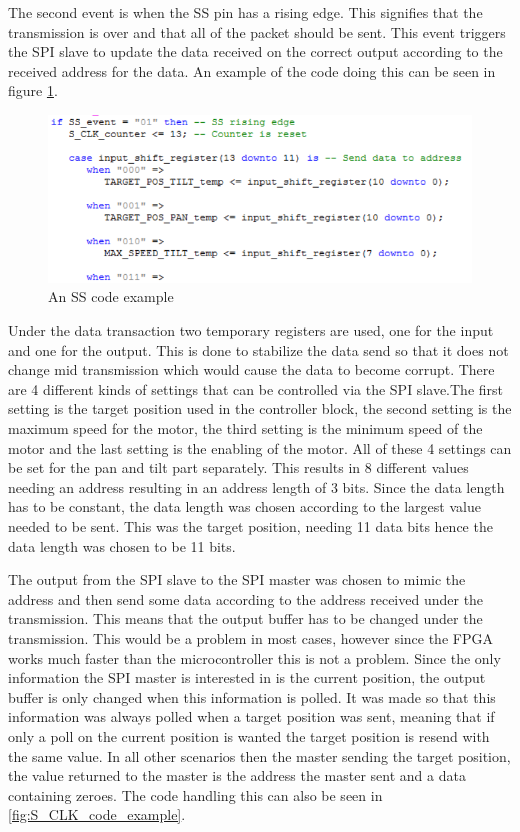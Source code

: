 \newpage

The second event is when the SS pin has a rising edge. This signifies that the transmission is over and that all of the packet should be sent. This event triggers the SPI slave to update the data received on the correct output according to the received address for the data. An example of the code doing this can be seen in figure \ref{fig:SS_code_example}.

\begin{figure}[h!]
\centering
\includegraphics[scale=0.5]{Billeder/FPGA/SPI_Slave/SS_code_example.png}
\caption{ An SS code example }
\label{fig:SS_code_example}
\end{figure}

Under the data transaction two temporary registers are used, one for the input and one for the output. This is done to stabilize the data send so that it does not change mid transmission which would cause the data to become corrupt.
There are 4 different kinds of settings that can be controlled via the SPI slave.The first setting is the target position used in the controller block, the second setting is the maximum speed for the motor, the third setting is the minimum speed of the motor and the last setting is the enabling of the motor. All of these 4  settings can be set for the pan and tilt part separately. This results in 8 different values needing an address resulting in an address length of 3 bits.
Since the data length has to be constant, the data length was chosen according to the largest value needed to be sent. This was the target position, needing 11 data bits hence the data length was chosen to be 11 bits. 

The output from the SPI slave to the SPI master was chosen to mimic the address and then send some data according to the address received under the transmission. This means that the output buffer has to be changed under the transmission. This would be a problem in most cases, however since the FPGA works much faster than the microcontroller this is not a problem. Since the only information the SPI master is interested in is the current position, the output buffer is only changed when this information is polled. It was made so that this information was always polled when a target position was sent, meaning that if only a poll on the current position is wanted the target position is resend with the same value. In all other scenarios then the master sending the target position, the value returned to the master is the address the master sent and a data containing zeroes. The code handling this can also be seen in \ref{fig:S_CLK_code_example}.

